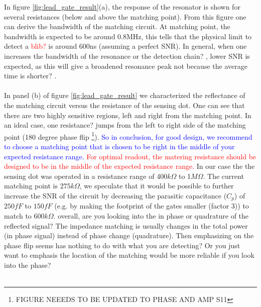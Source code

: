 \documentclass[twocolumn]{article}
\begin{document}
In figure \ref{fig:lead_gate_result}(a), the response of the resonator is shown for several resistances (below and above the matching point). From this figure one can derive the bandwidth of the matching circuit. At matching point, the bandwidth is expected to be around 0.8MHz, this tells that the physical limit to detect a \textcolor{red}{blib?} is around 600ns (assuming a perfect SNR). In general, when one increases the bandwidth \color{red} of the resonance or the detection chain? \color{black}, lower SNR is expected, as this will give a broadened resonance peak \color{red} not because the average time is shorter? \color{black}.
\\ \\
In panel (b) of figure \ref{fig:lead_gate_result} we characterized the reflectance of the matching circuit versus the resistance of the sensing dot. One can see that there are two highly sensitive regions, left and right from the matching point. In an ideal case, one \color{red}resistance? \color{black} jumps from the left to right side of the matching point (180 degree phase flip \footnote{FIGURE NEEEDS TO BE UPDATED TO PHASE AND AMP S11}). \textcolor{blue}{So in conclusion, for good design, we recommend to choose a matching point that is chosen to be right in the middle of your expected resistance range.} \textcolor{red}{For optimal readout, the matering resistance should be designed to be in the middle of the expected resistance range.} In our case the the sensing dot was operated in a resistance range of 400$k\Omega$ to 1$M\Omega$. The current matching point is $275k\Omega$, we speculate that it would be possible to further increase the SNR of the circuit by decreasing the parasitic capacitance ($C_p$) of $250fF$ to $150fF$ (e.g. by making the footprint of the gates smaller (factor 3)) to match to $600k\Omega$. \color{red} overall, are you looking into the in phase or quadrature of the reflected signal? The impedance matching is usually changes in the total power (in phase signal) instead of phase change (quadrature). Then emphasizing on the phase flip seems has nothing to do with what you are detecting? Or you just want to emphasis the location of the matching would be more reliable if you look into the phase? \color{black} 
\\ \\
\end{document}
